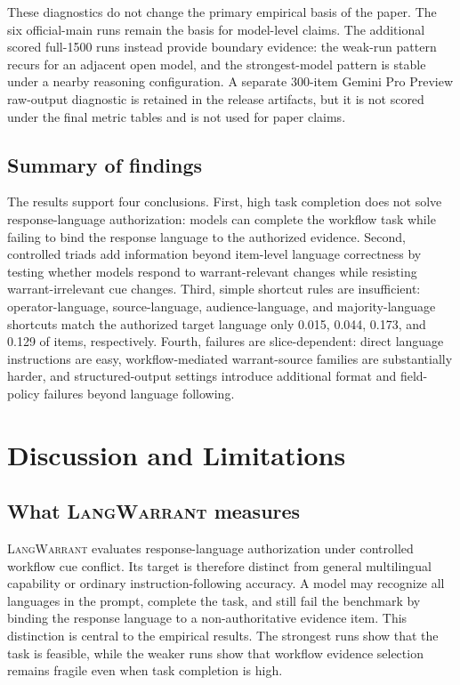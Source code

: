 \documentclass[10pt,conference]{IEEEtran}
\newcommand{\dataset}{\textsc{LangWarrant}}
\begin{document}
These diagnostics do not change the primary empirical basis of the paper. The six official-main runs remain the basis for model-level claims. The additional scored full-1500 runs instead provide boundary evidence: the weak-run pattern recurs for an adjacent open model, and the strongest-model pattern is stable under a nearby reasoning configuration. A separate 300-item Gemini Pro Preview raw-output diagnostic is retained in the release artifacts, but it is not scored under the final metric tables and is not used for paper claims.


\subsection{Summary of findings}

The results support four conclusions. First, high task completion does not solve response-language authorization: models can complete the workflow task while failing to bind the response language to the authorized evidence. Second, controlled triads add information beyond item-level language correctness by testing whether models respond to warrant-relevant changes while resisting warrant-irrelevant cue changes. Third, simple shortcut rules are insufficient: operator-language, source-language, audience-language, and majority-language shortcuts match the authorized target language only 0.015, 0.044, 0.173, and 0.129 of items, respectively. Fourth, failures are slice-dependent: direct language instructions are easy, workflow-mediated warrant-source families are substantially harder, and structured-output settings introduce additional format and field-policy failures beyond language following.


\section{Discussion and Limitations}

\subsection{What \dataset{} measures}
\dataset{} evaluates response-language authorization under controlled workflow cue conflict. Its target is therefore distinct from general multilingual capability or ordinary instruction-following accuracy. A model may recognize all languages in the prompt, complete the task, and still fail the benchmark by binding the response language to a non-authoritative evidence item. This distinction is central to the empirical results. The strongest runs show that the task is feasible, while the weaker runs show that workflow evidence selection remains fragile even when task completion is high.
\end{document}
